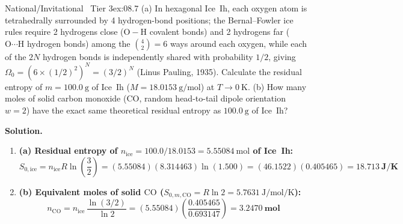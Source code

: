 \begin{workedexample}{National/Invitational \textbar\ Tier 3}{ex:08.7}
(a) In hexagonal Ice~Ih, each oxygen atom is tetrahedrally surrounded by 4 hydrogen-bond positions; the Bernal--Fowler ice rules require 2 hydrogens close ($\mathrm{O-H}$ covalent bonds) and 2 hydrogens far ($\mathrm{O\cdots H}$ hydrogen bonds) among the $\binom{4}{2} = 6$ ways around each oxygen, while each of the $2N$ hydrogen bonds is independently shared with probability $1/2$, giving $\Omega_0 = \left(6 \times (1/2)^2\right)^N = (3/2)^N$ (Linus Pauling, 1935). Calculate the residual entropy of $m = \SI{100.0}{\gram}$ of Ice~Ih ($M = \SI{18.0153}{\gram\per\mole}$) at $T \to \SI{0}{\kelvin}$.
(b) How many moles of solid carbon monoxide ($\mathrm{CO}$, random head-to-tail dipole orientation $w = 2$) have the exact same theoretical residual entropy as $\SI{100.0}{\gram}$ of Ice~Ih?
\par\smallskip\noindent
\textbf{Solution.}
\begin{enumerate}
  \item \textbf{(a) Residual entropy of $n_{\mathrm{ice}} = 100.0 / 18.0153 = \SI{5.55084}{\mole}$ of Ice~Ih:}
  \[
    S_{0,\mathrm{ice}} = n_{\mathrm{ice}} R \ln\left(\frac{3}{2}\right) = (5.55084)(8.314463)\ln(1.500) = (46.1522)(0.405465) = \mathbf{\SI{18.713}{\joule\per\kelvin}}
  \]
  \item \textbf{(b) Equivalent moles of solid $\mathrm{CO}$ ($S_{0,m,\mathrm{CO}} = R\ln 2 = \SI{5.7631}{\joule\per\mole\per\kelvin}$):}
  \[
    n_{\mathrm{CO}} = n_{\mathrm{ice}}\,\frac{\ln(3/2)}{\ln 2} = (5.55084)\left(\frac{0.405465}{0.693147}\right) = \mathbf{\SI{3.2470}{\mole}}
  \]
\end{enumerate}
\end{workedexample}

